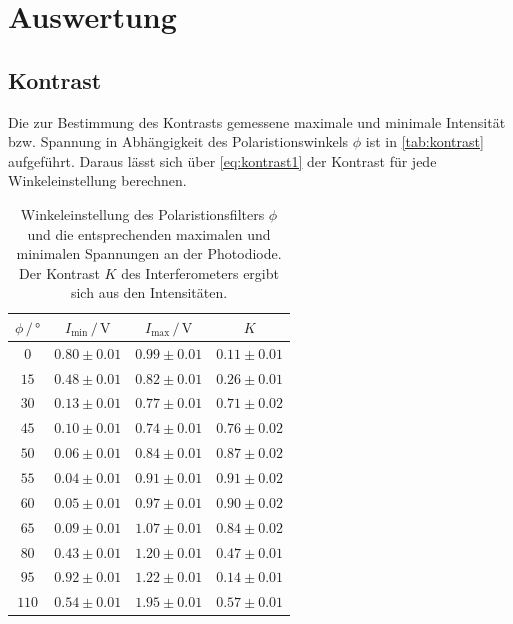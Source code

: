 \section{Auswertung}
\label{sec:Auswertung}

\subsection{Kontrast}

Die zur Bestimmung des Kontrasts gemessene maximale und minimale Intensität bzw. Spannung in Abhängigkeit des Polaristionswinkels $\phi$ ist in \autoref{tab:kontrast} aufgeführt.
Daraus lässt sich über \autoref{eq:kontrast1} der Kontrast für jede Winkeleinstellung berechnen. 
\begin{table}
    \centering
    \caption{Winkeleinstellung des Polaristionsfilters $\phi$ und die entsprechenden maximalen und minimalen Spannungen an der Photodiode. Der Kontrast $K$ des Interferometers ergibt sich aus den Intensitäten.}
    \label{tab:kontrast}
    \begin{tabular}{c c c c}
        \toprule
        $\phi \,/\, \unit{\degree}$ & $I_\text{min} \,/\, \unit{\volt}$ & $I_\text{max} \,/\, \unit{\volt}$ & $K$ \\
        \midrule
        $0  $ &   $ 0.80\pm 0.01$ & $ 	0.99 \pm 0.01$ &  $ 0.11 \pm 0.01 $ \\
        $15	$ &   $ 0.48\pm 0.01$ & $	0.82 \pm 0.01$ &  $ 0.26 \pm 0.01 $ \\
        $30	$ &   $ 0.13\pm 0.01$ & $	0.77 \pm 0.01$ &  $ 0.71 \pm 0.02 $ \\
        $45	$ &   $ 0.10\pm 0.01$ & $	0.74 \pm 0.01$ &  $ 0.76 \pm 0.02 $ \\
        $50	$ &   $ 0.06\pm 0.01$ & $	0.84 \pm 0.01$ &  $ 0.87 \pm 0.02 $ \\
        $55	$ &   $ 0.04\pm 0.01$ & $	0.91 \pm 0.01$ &  $ 0.91 \pm 0.02 $ \\
        $60	$ &   $ 0.05\pm 0.01$ & $	0.97 \pm 0.01$ &  $ 0.90 \pm 0.02 $ \\
        $65	$ &   $ 0.09\pm 0.01$ & $	1.07 \pm 0.01$ &  $ 0.84 \pm 0.02 $ \\
        $80	$ &   $ 0.43\pm 0.01$ & $	1.20 \pm 0.01$ &  $ 0.47 \pm 0.01 $ \\
        $95	$ &   $ 0.92\pm 0.01$ & $	1.22 \pm 0.01$ &  $ 0.14 \pm 0.01 $ \\
        $110$ &   $ 0.54\pm 0.01$ & $  	1.95 \pm 0.01$ &  $ 0.57 \pm 0.01 $ \\

\end{tabular}
\end{table}
